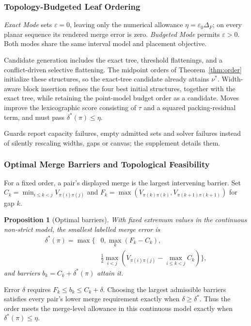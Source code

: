 \documentclass[review]{vgtc}
\newtheorem{proposition}{Proposition}
\begin{document}
\subsubsection{Topology-Budgeted Leaf Ordering}
\emph{Exact Mode} sets $\varepsilon=0$, leaving only the numerical allowance $\eta=\varepsilon_0\Delta_F$; on every planar sequence its rendered merge error is zero. \emph{Budgeted Mode} permits $\varepsilon>0$. Both modes share the same interval model and placement objective.

Candidate generation includes the exact tree, threshold flattenings, and a conflict-driven selective flattening. The midpoint orders of Theorem~\ref{thm:order} initialize these structures, so the exact-tree candidate already attains $\nu^*$. Width-aware block insertion refines the four best initial structures, together with the exact tree, while retaining the point-model budget order as a candidate. Moves improve the lexicographic score consisting of $\tau$ and a squared packing-residual term, and must pass $\delta^*(\pi)\le\eta$.

Guards report capacity failures, empty admitted sets and solver failures instead of silently rescaling widths, gaps or canvas; the supplement details them.

\subsubsection{Optimal Merge Barriers and Topological Feasibility}
For a fixed order, a pair's displayed merge is the largest intervening barrier. Set $C_k=\min_{i\le k<j}V_{\pi(i)\pi(j)}$ and $F_k=\max(V_{\pi(k)\pi(k)},V_{\pi(k+1)\pi(k+1)})$ for gap $k$.
\begin{proposition}[Optimal barriers]\label{prop:barriers}
With fixed extremum values in the continuous non-strict model, the smallest labelled merge error is
\begin{equation}\label{eq:delta}
\begin{split}
 \delta^*(\pi)=\max\bigg\{&0,\max_k(F_k-C_k),\\
 &\frac12\max_{i<j}\left(V_{\pi(i)\pi(j)}-
                         \max_{i\le k<j}C_k\right)\bigg\},
\end{split}
\end{equation}
and barriers $b_k=C_k+\delta^*(\pi)$ attain it.
\end{proposition}
Error $\delta$ requires $F_k\le b_k\le C_k+\delta$. Choosing the largest admissible barriers satisfies every pair's lower merge requirement exactly when $\delta\ge\delta^*$. Thus the order meets the merge-level allowance in this continuous model exactly when $\delta^*(\pi)\le\eta$.
\end{document}
